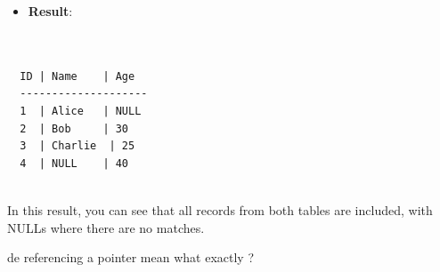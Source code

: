 \begin{botresponse}
\begin{lstlisting}[breaklines=true, breakatwhitespace=false]
\end{lstlisting}

\begin{itemize}
\item \textbf{Result}:
\end{itemize}

\begin{lstlisting}[breaklines=true, breakatwhitespace=false]


  ID | Name    | Age
  --------------------
  1  | Alice   | NULL
  2  | Bob     | 30
  3  | Charlie  | 25
  4  | NULL    | 40
  

\end{lstlisting}

In this result, you can see that all records from both tables are included, with NULLs where there are no matches.

\end{botresponse}

\begin{userprompt}

de referencing a pointer mean what exactly ?

\end{userprompt}


